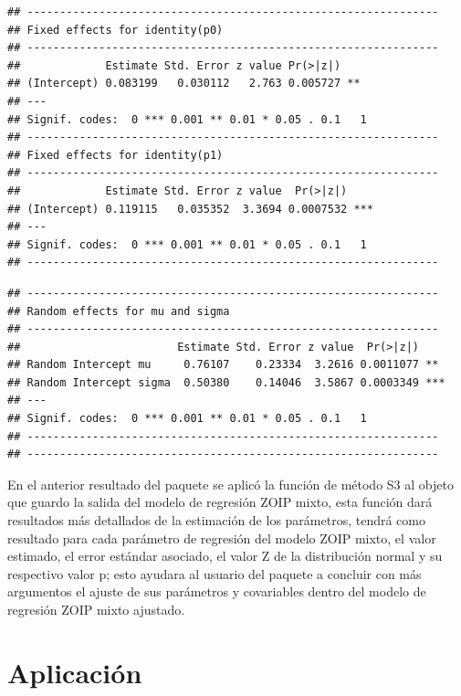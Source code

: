 \begin{verbatim}
## ---------------------------------------------------------------
## Fixed effects for identity(p0) 
## ---------------------------------------------------------------
##             Estimate Std. Error z value Pr(>|z|)   
## (Intercept) 0.083199   0.030112   2.763 0.005727 **
## ---
## Signif. codes:  0 *** 0.001 ** 0.01 * 0.05 . 0.1   1
## ---------------------------------------------------------------
## Fixed effects for identity(p1) 
## ---------------------------------------------------------------
##             Estimate Std. Error z value  Pr(>|z|)    
## (Intercept) 0.119115   0.035352  3.3694 0.0007532 ***
## ---
## Signif. codes:  0 *** 0.001 ** 0.01 * 0.05 . 0.1   1
## ---------------------------------------------------------------
\end{verbatim}

\begin{verbatim}
## ---------------------------------------------------------------
## Random effects for mu and sigma 
## ---------------------------------------------------------------
##                        Estimate Std. Error z value  Pr(>|z|)    
## Random Intercept mu     0.76107    0.23334  3.2616 0.0011077 ** 
## Random Intercept sigma  0.50380    0.14046  3.5867 0.0003349 ***
## ---
## Signif. codes:  0 *** 0.001 ** 0.01 * 0.05 . 0.1   1
## ---------------------------------------------------------------
## ---------------------------------------------------------------
\end{verbatim}

En el anterior resultado del paquete  se aplic\'{o} la funci\'{o}n de m\'{e}todo S3  al objeto que guardo la salida del modelo de regresi\'{o}n ZOIP mixto, esta funci\'{o}n dar\'{a} resultados m\'{a}s detallados de la estimaci\'{o}n de los par\'{a}metros, tendr\'{a} como resultado para cada par\'{a}metro de regresi\'{o}n del modelo ZOIP mixto, el valor estimado, el error est\'{a}ndar asociado, el valor Z de la distribuci\'{o}n normal y su respectivo valor p; esto ayudara al usuario del paquete  a concluir con m\'{a}s argumentos el ajuste de sus par\'{a}metros y covariables dentro del modelo de regresi\'{o}n ZOIP mixto ajustado.
 
\section{Aplicaci\'{o}n}

